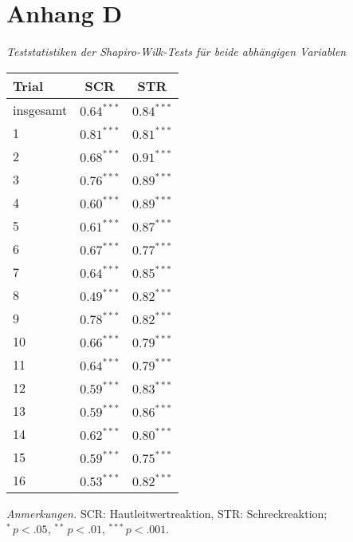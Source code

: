 	\newpage

\section*{Anhang D} \label{appD}

	\noindent \textit{Teststatistiken der Shapiro-Wilk-Tests für beide abhängigen Variablen}

	\vspace*{0.3cm}
		\begin{threeparttable}
			\begin{tabularx}{0.7\textwidth}{XCC}   \toprule
			 	Trial      	& SCR		 	& STR		\\ \hline {}
			 	insgesamt  	& $0.64^{***}$		& $0.84^{***}$	\\
			 	 1 		& $0.81^{***}$  	& $0.81^{***}$	\\
			 	 2 		& $0.68^{***}$  	& $0.91^{***}$	\\
			 	 3 		& $0.76^{***}$  	& $0.89^{***}$	\\
			 	 4 		& $0.60^{***}$  	& $0.89^{***}$	\\
			 	 5 		& $0.61^{***}$  	& $0.87^{***}$	\\
			 	 6 		& $0.67^{***}$  	& $0.77^{***}$	\\
			 	 7 		& $0.64^{***}$  	& $0.85^{***}$	\\
			 	 8 		& $0.49^{***}$  	& $0.82^{***}$	\\
			 	 9  	& $0.78^{***}$  	& $0.82^{***}$	\\
			 	 10 	& $0.66^{***}$  	& $0.79^{***}$  \\
			 	 11 	& $0.64^{***}$  	& $0.79^{***}$	\\
			 	 12 	& $0.59^{***}$  	& $0.83^{***}$	\\
			 	 13 	& $0.59^{***}$  	& $0.86^{***}$	\\
			 	 14 	& $0.62^{***}$  	& $0.80^{***}$	\\
			 	 15 	& $0.59^{***}$  	& $0.75^{***}$	\\
			 	 16 	& $0.53^{***}$  	& $0.82^{***}$	\\\bottomrule
			\end{tabularx}
			\begin{tablenotes}
				\footnotesize{\item \textit{Anmerkungen.} SCR: Hautleitwertreaktion, STR: Schreckreaktion; \\ ${}^{*}\, p<.05$, ${}^{**}\, p<.01$, ${}^{***}\, p<.001$.}
			\end{tablenotes}
		\end{threeparttable}
	\newpage



